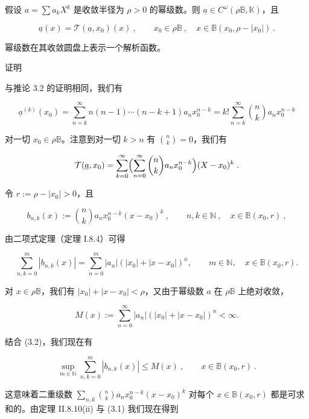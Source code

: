 \begin{proposition}

假设 $ a = \sum a_k X^k $ 是收敛半径为 $ \rho > 0 $ 的幂级数。则 $ \underline{a} \in C^\omega(\rho\mathbb{B}, \mathbb{K}) $，且

\[
{\underline{{a}}}(x)={\mathcal{T}}({\underline{{a}}},x_{0})(x)~,\qquad x_{0}\in\rho{\mathbb{B}}~,\quad x\in{\mathbb{B}}(x_{0},\rho-|x_{0}|)~.
\]

幂级数在其收敛圆盘上表示一个解析函数。

证明

\begin{subitems}
\item

与推论 3.2 的证明相同，我们有

\[
\underline{a}^{(k)}(x_{0})=\sum_{n=k}^{\infty}n(n-1)\cdots(n-k+1)a_{n}x_{0}^{n-k}=k!\sum_{n=k}^{\infty}\binom{n}{k}a_{n}x_{0}^{n-k}
\]

对一切 $ x_0 \in \rho\mathbb{B} $。注意到对一切 $ k > n $ 有 $ \binom{n}{k} = 0 $，我们有

\begin{equation}
\mathcal{T}(\underline{{a}},x_{0})=\sum_{k=0}^{\infty}\Bigl(\sum_{n=0}^{\infty}\binom{n}{k}a_{n}x_{0}^{n-k}\Bigr)(X-x_{0})^{k}\;.
\end{equation}
\item

令 $ r := \rho - |x_0| > 0 $，且

\[
b_{n,k}(x):=\binom{n}{k}a_{n}x_{0}^{n-k}(x-x_{0})^{k}~,\qquad n,k\in\mathbb{N}~,\quad x\in\mathbb{B}(x_{0},r)~,
\]

由二项式定理（定理 I.8.4）可得

\begin{equation}
\sum_{n,k=0}^{m}|b_{n,k}(x)|=\sum_{n=0}^{m}|a_{n}|\left(|x_{0}|+|x-x_{0}|\right)^{n},\qquad m\in\mathbb{N},\quad x\in\mathbb{B}(x_{0},r).
\end{equation}

对 $ x \in \rho\mathbb{B} $，我们有 $ |x_0| + |x - x_0| < \rho $，又由于幂级数 $ a $ 在 $ \rho\mathbb{B} $ 上绝对收敛，

\[
M(x):=\sum_{n=0}^{\infty}\left|a_{n}\right|\left(\left|x_{0}\right|+\left|x-x_{0}\right|\right)^{n}<\infty.
\]

结合 (3.2)，我们现在有

\[
\operatorname*{s u p}_{m\in\mathbb{N}}\sum_{n,k=0}^{m}|b_{n,k}(x)|\leq M(x)~,\qquad x\in\mathbb{B}(x_{0},r)~.
\]

这意味着二重级数 $ \sum_{n,k}\binom{n}{k}a_n x_0^{n-k}(x - x_0)^k $ 对每个 $ x \in \mathbb{B}(x_0, r) $ 都是可求和的。由定理 II.8.10(ii) 与 (3.1) 我们现在得到


\end{subitems}
\end{proposition}
